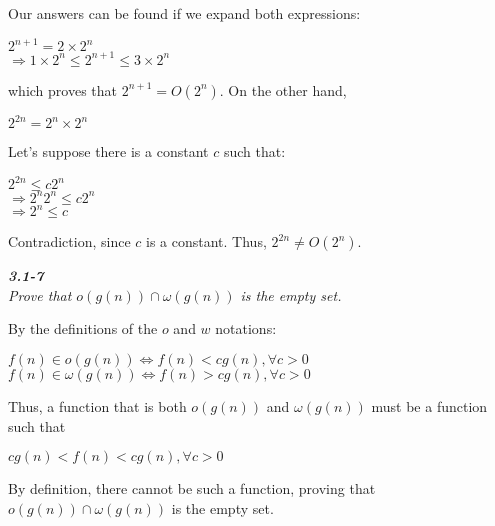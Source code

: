 \documentclass[8pt,a4paper]{article}
\begin{document}
Our answers can be found if we expand both expressions:

\begin{center}
  $2^{n+1} = 2 \times 2^{n}$ \\
  $\Rightarrow 1 \times 2^{n} \leq 2^{n + 1} \leq 3 \times 2^{n}$
\end{center}

which proves that $2^{n + 1} = O(2^{n})$. On the other hand,

\begin{center}
  $2^{2n} = 2^{n} \times 2^{n}$
\end{center}

Let's suppose there is a constant $c$ such that:

\begin{center}
  $2^{2n} \leq c2^{n}$ \\
  $\Rightarrow 2^{n}2^{n} \leq c2^{n}$ \\
  $\Rightarrow 2^{n} \leq c$
\end{center}

Contradiction, since $c$ is a constant. Thus, $2^{2n} \neq O(2^{n})$.

\begin{framed}
\textbf{\textit{3.1-7}} \\
\textit{Prove that $o(g(n)) \cap \omega(g(n))$ is the empty set.}
\end{framed}

By the definitions of the $o$ and $w$ notations:

\begin{center}
  $f(n) \in o(g(n)) \iff f(n) < cg(n), \forall c > 0$ \\
  $f(n) \in \omega(g(n)) \iff f(n) > cg(n), \forall c > 0$
\end{center}

Thus, a function that is both $o(g(n))$ and $\omega(g(n))$ must be a
function such that

\begin{center}
  $cg(n) < f(n) < cg(n), \forall c > 0$
\end{center}

By definition, there cannot be such a function, proving that $o(g(n)) \cap \omega(g(n))$
is the empty set.

\end{document}
